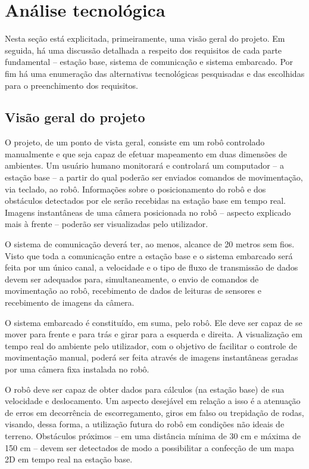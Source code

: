 \chapter{Análise tecnológica}
Nesta seção está explicitada, primeiramente, uma visão geral do projeto. Em seguida, há uma discussão detalhada a respeito dos requisitos de cada parte fundamental -- estação base, sistema de comunicação e sistema embarcado. Por fim há uma enumeração das alternativas tecnológicas pesquisadas e das escolhidas para o preenchimento dos requisitos.

\section{Visão geral do projeto}

O projeto, de um ponto de vista geral, consiste em um robô controlado manualmente e que seja capaz de efetuar mapeamento em duas dimensões de ambientes. Um usuário humano monitorará e controlará um computador -- a estação base -- a partir do qual poderão ser enviados comandos de movimentação, via teclado, ao robô. Informações sobre o posicionamento do robô e dos obstáculos detectados por ele serão recebidas na estação base em tempo real. Imagens instantâneas de uma câmera posicionada no robô -- aspecto explicado mais à frente -- poderão ser visualizadas pelo utilizador.

O sistema de comunicação deverá ter, ao menos, alcance de 20 metros sem fios. Visto que toda a comunicação entre a estação base e o sistema embarcado será feita por um único canal, a velocidade e o tipo de fluxo de transmissão de dados devem ser adequados para, simultaneamente, o envio de comandos de movimentação ao robô, recebimento de dados de leituras de sensores e recebimento de imagens da câmera.

O sistema embarcado é constituído, em suma, pelo robô. Ele deve ser capaz de se mover para frente e para trás e girar para a esquerda e direita. A visualização em tempo real do ambiente pelo utilizador, com o objetivo de facilitar o controle de movimentação manual, poderá ser feita através de imagens instantâneas geradas por uma câmera fixa instalada no robô. 

O robô deve ser capaz de obter dados para cálculos (na estação base) de sua velocidade e deslocamento. Um aspecto desejável em relação a isso é a atenuação de erros em decorrência de escorregamento, giros em falso ou trepidação de rodas, visando, dessa forma, a utilização futura do robô em condições não ideais de terreno. Obstáculos próximos -- em uma distância mínima de 30 cm e máxima de 150 cm -- devem ser detectados de modo a possibilitar a confecção de um mapa 2D em tempo real na estação base.

